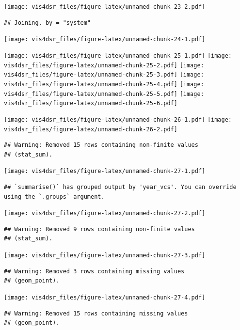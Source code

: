 \documentclass[
]{krantz}
\begin{document}
\texttt{[image: vis4dsr\_files/figure-latex/unnamed-chunk-23-2.pdf]}

\begin{verbatim}
## Joining, by = "system"
\end{verbatim}

\texttt{[image: vis4dsr\_files/figure-latex/unnamed-chunk-24-1.pdf]}

\texttt{[image: vis4dsr\_files/figure-latex/unnamed-chunk-25-1.pdf]} \texttt{[image: vis4dsr\_files/figure-latex/unnamed-chunk-25-2.pdf]} \texttt{[image: vis4dsr\_files/figure-latex/unnamed-chunk-25-3.pdf]} \texttt{[image: vis4dsr\_files/figure-latex/unnamed-chunk-25-4.pdf]} \texttt{[image: vis4dsr\_files/figure-latex/unnamed-chunk-25-5.pdf]} \texttt{[image: vis4dsr\_files/figure-latex/unnamed-chunk-25-6.pdf]}

\texttt{[image: vis4dsr\_files/figure-latex/unnamed-chunk-26-1.pdf]} \texttt{[image: vis4dsr\_files/figure-latex/unnamed-chunk-26-2.pdf]}

\begin{verbatim}
## Warning: Removed 15 rows containing non-finite values
## (stat_sum).
\end{verbatim}

\texttt{[image: vis4dsr\_files/figure-latex/unnamed-chunk-27-1.pdf]}

\begin{verbatim}
## `summarise()` has grouped output by 'year_vcs'. You can override using the `.groups` argument.
\end{verbatim}

\texttt{[image: vis4dsr\_files/figure-latex/unnamed-chunk-27-2.pdf]}

\begin{verbatim}
## Warning: Removed 9 rows containing non-finite values
## (stat_sum).
\end{verbatim}

\texttt{[image: vis4dsr\_files/figure-latex/unnamed-chunk-27-3.pdf]}

\begin{verbatim}
## Warning: Removed 3 rows containing missing values
## (geom_point).
\end{verbatim}

\texttt{[image: vis4dsr\_files/figure-latex/unnamed-chunk-27-4.pdf]}

\begin{verbatim}
## Warning: Removed 15 rows containing missing values
## (geom_point).
\end{verbatim}
\end{document}

